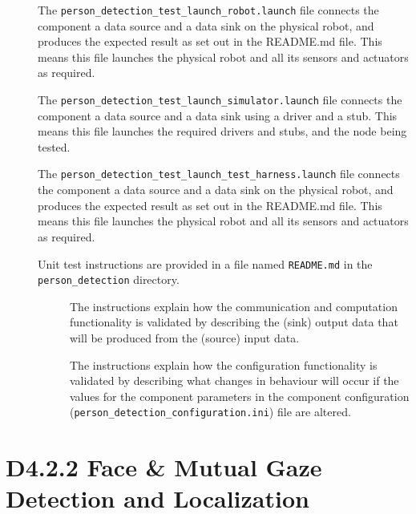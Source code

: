 \documentclass{CSSRforAfrica}
\newcommand{\checkboxChecked}{\fbox{\ding{51}}} %
\newcommand{\checkboxDashed}{\fbox{--}}         %
\begin{document}
\begin{description}
\item[\checkboxChecked] The {\small \verb+person_detection_test_launch_robot.launch+} file connects the component a data source and a data sink on the physical robot, and produces the expected result as set out in the README.md file. This means this file launches the physical robot and all its sensors and actuators as required.

\item[\checkboxDashed]   The {\small \verb+person_detection_test_launch_simulator.launch+} file connects the component a data source and a data sink using a driver and a stub. This means this file launches the required drivers and stubs, and the node being tested.

\item[\checkboxChecked]   The {\small \verb+person_detection_test_launch_test_harness.launch+} file connects the component a data source and a data sink on the physical robot, and produces the expected result as set out in the README.md file. This means this file launches the physical robot and all its sensors and actuators as required.

\item[\checkboxChecked] Unit test instructions are provided in a file named {\small \verb+README.md+} in the  {\small \verb+person_detection+} directory. 


\begin{description}

\item[\checkboxChecked] The instructions explain how the communication and computation functionality is validated by describing the (sink) output data that will be produced from the (source) input data.  

\item[\checkboxChecked] The instructions explain how the configuration functionality is validated by describing what changes in behaviour will occur if the values for the component parameters in the component configuration ({\small \verb+person_detection_configuration.ini+}) file are altered.

\end{description}
\end{description} 
\newpage



\section{D4.2.2 Face \& Mutual Gaze Detection and Localization} 
\end{document}
